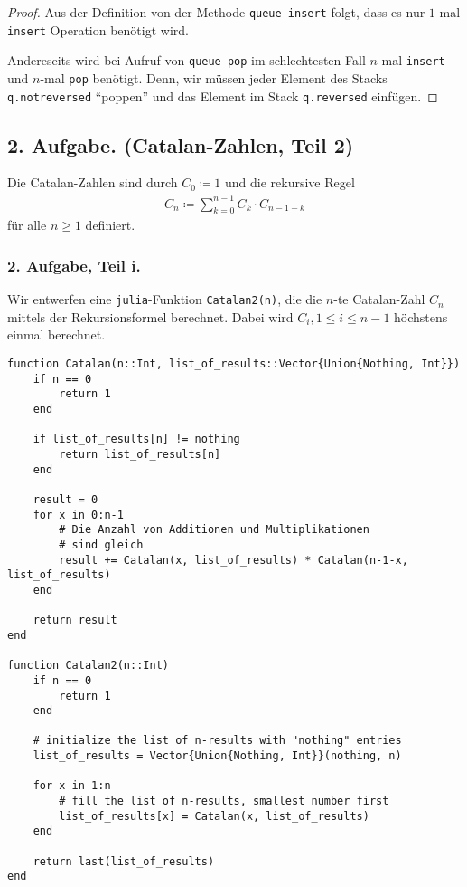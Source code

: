\documentclass[draft,a5paper]{article}
\begin{document}
\begin{proof}
  Aus der Definition von der Methode \texttt{queue\textunderscore
    insert} folgt, dass es nur \(1\)-mal \texttt{insert} Operation
  benötigt wird.

  Andereseits wird bei Aufruf von \texttt{queue\textunderscore
    pop} im schlechtesten Fall \(n\)-mal \texttt{insert} und \(n\)-mal
  \texttt{pop} benötigt.  Denn, wir müssen jeder Element des Stacks
  \texttt{q.not\textunderscore reversed} "`poppen"' und das Element
  im Stack \texttt{q.reversed} einfügen.
\end{proof}

\newpage

\subsection*{2. Aufgabe. (Catalan-Zahlen, Teil 2)}

Die Catalan-Zahlen sind durch \(C_{0} \coloneq 1\) und die rekursive Regel
\begin{align*}
  C_{n} \coloneq \sum_{k=0}^{n-1}{C_{k} \cdot C_{n-1-k}}
\end{align*}
für alle \(n \ge 1\) definiert.

\subsubsection*{2. Aufgabe, Teil i.}

Wir entwerfen eine \texttt{julia}-Funktion \texttt{Catalan2(n)}, die
die \(n\)-te Catalan-Zahl \(C_{n}\) mittels der Rekursionsformel
berechnet. Dabei wird \(C_{i}, 1 \le i \le n - 1\) höchstens einmal berechnet.

\begin{verbatim}
function Catalan(n::Int, list_of_results::Vector{Union{Nothing, Int}})
    if n == 0
        return 1
    end

    if list_of_results[n] != nothing
        return list_of_results[n]
    end

    result = 0
    for x in 0:n-1
        # Die Anzahl von Additionen und Multiplikationen
        # sind gleich
        result += Catalan(x, list_of_results) * Catalan(n-1-x, list_of_results)
    end

    return result
end

function Catalan2(n::Int)
    if n == 0
        return 1
    end

    # initialize the list of n-results with "nothing" entries
    list_of_results = Vector{Union{Nothing, Int}}(nothing, n)

    for x in 1:n
        # fill the list of n-results, smallest number first
        list_of_results[x] = Catalan(x, list_of_results)
    end

    return last(list_of_results)
end
\end{verbatim}
\end{document}
